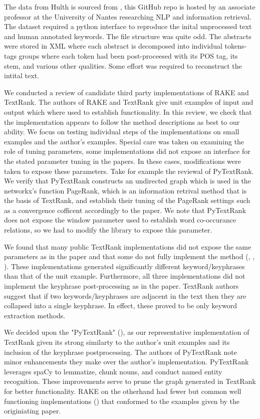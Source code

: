 \documentclass[11pt,a4paper]{article}
\begin{document}
The data from Hulth is sourced from \citet{Boudin}, this GitHub repo is hosted by an associate professor at the University of Nantes researching NLP and information retrieval. The dataset required a python interface to reproduce the inital unprocessed text and human annotated keywords. The file structure was quite odd. The abstracts were stored in XML where each abstract is decomposed into individual tokens-tags groups where each token had been post-proceesed with its POS tag, its stem, and various other qualities. Some effort was required to reconstruct the intital text.

We conducted a review of candidate third party implementations of RAKE and TextRank. The authors of RAKE and TextRank give unit examples of input and output which where used to establish functionality. In this review, we check that the implementation appears to follow the method descriptions as best to our ability. We focus on testing individual steps of the implementations on small examples and the author's examples. Special care was taken on examining the role of tuning parameters, some implementations did not expose an interface for the stated parameter tuning in the papers. In these cases, modifications were taken to expose these parameters. Take for example the reviewal of PyTextRank. We verify that PyTextRank constructs an undirected graph which is used in the networkx's function PageRank, which is an information retrival method that is the basis of TextRank, and establish their tuning of the PageRank settings such as a convergence cofficent accordingly to the paper. We note that PyTextRank does not expose the window parameter used to establish word co-occurance relations, so we had to modify the library to expose this parameter.

We found that many public TextRank implementations did not expose the same parameters as in the paper and that some do not fully implement the method (\citet{TextRank-alt1}, \citet{TextRank-alt2}, \citet{TextRank-alt3}). These implementations generated significantly different keyword/keyphrases than that of the unit example. Furthermore, all three implementations did not implement the keyphrase post-processing as in the paper. TextRank authors suggest that if two keywords/keyphrases are adjacent in the text then they are collapsed into a single keyphrase. In effect, these proved to be only keyword extraction methods. 

We decided upon the "PyTextRank" (\citet{PyTextRank}), as our representative implementation of TextRank given its strong similarty to the author's unit examples and its inclusion of the keyphrase postprocessing. The authors of PyTextRank note minor enhancements they make over the author's implementation. PyTextRank leverages spaCy to lemmatize, chunk nouns, and conduct named entity recognition. These improvements serve to prune the graph generated in TextRank for better functionality. RAKE on the otherhand had fewer but common well functioning implementations (\citet{2}) that conformed to the examples given by the originiating paper. 
\end{document}
